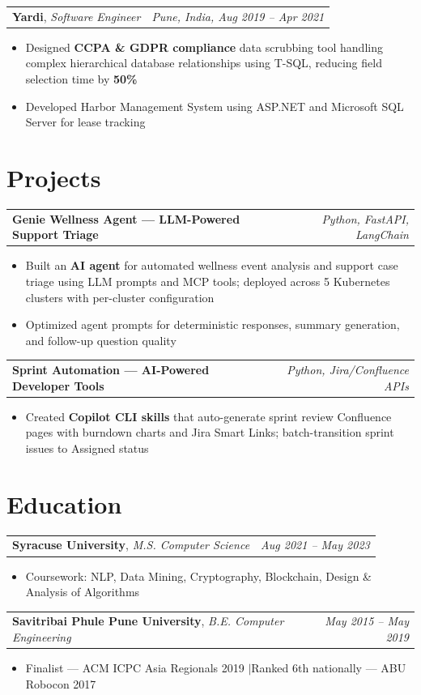 \documentclass[letterpaper,10pt]{article}
\makeatletter
\newcommand{\resumeSubheading}[4]{
  \vspace{8pt}\noindent
  \begin{tabularx}{\textwidth}{@{}X r@{}}
    \textbf{#1}, \textit{#2} & \textit{\small #3, #4}
  \end{tabularx}
  \vspace{-8pt}
}
\newcommand{\resumeSubheadingSimple}[3]{
  \vspace{8pt}\noindent
  \begin{tabularx}{\textwidth}{@{}X r@{}}
    \textbf{#1}, \textit{#2} & \textit{\small #3} \\
  \end{tabularx}
  \vspace{-8pt}
}
\newcommand{\projectHeading}[2]{
  \vspace{8pt}\noindent
  \begin{tabularx}{\textwidth}{@{}X r@{}}
    \textbf{#1} & \textit{\small #2} \\
  \end{tabularx}
  \vspace{-8pt}
}
\makeatother
\begin{document}
\resumeSubheading
  {Yardi}{Software Engineer}{Pune, India}{Aug 2019 -- Apr 2021}
\begin{itemize}[leftmargin=0.15in, nosep, itemsep=3pt, topsep=0pt]
  \item Designed \textbf{CCPA \& GDPR compliance} data scrubbing tool handling complex hierarchical database relationships using T-SQL, reducing field selection time by \textbf{50\%}
  \item Developed Harbor Management System using ASP.NET and Microsoft SQL Server for lease tracking
\end{itemize}

\section{Projects}

\projectHeading{Genie Wellness Agent --- LLM-Powered Support Triage}{Python, FastAPI, LangChain}
\begin{itemize}[leftmargin=0.15in, nosep, itemsep=3pt, topsep=0pt]
  \item Built an \textbf{AI agent} for automated wellness event analysis and support case triage using LLM prompts and MCP tools; deployed across 5 Kubernetes clusters with per-cluster configuration
  \item Optimized agent prompts for deterministic responses, summary generation, and follow-up question quality
\end{itemize}

\projectHeading{Sprint Automation --- AI-Powered Developer Tools}{Python, Jira/Confluence APIs}
\begin{itemize}[leftmargin=0.15in, nosep, itemsep=3pt, topsep=0pt]
  \item Created \textbf{Copilot CLI skills} that auto-generate sprint review Confluence pages with burndown charts and Jira Smart Links; batch-transition sprint issues to Assigned status
\end{itemize}

\section{Education}

\resumeSubheadingSimple
  {Syracuse University}{M.S. Computer Science}{Aug 2021 -- May 2023}
\begin{itemize}[leftmargin=0.15in, nosep, itemsep=3pt, topsep=0pt]
  \item Coursework: NLP, Data Mining, Cryptography, Blockchain, Design \& Analysis of Algorithms
\end{itemize}

\resumeSubheadingSimple
  {Savitribai Phule Pune University}{B.E. Computer Engineering}{May 2015 -- May 2019}
\begin{itemize}[leftmargin=0.15in, nosep, itemsep=3pt, topsep=0pt]
  \item Finalist --- ACM ICPC Asia Regionals 2019 \enspace$|$\enspace Ranked 6th nationally --- ABU Robocon 2017
\end{itemize}
\end{document}
